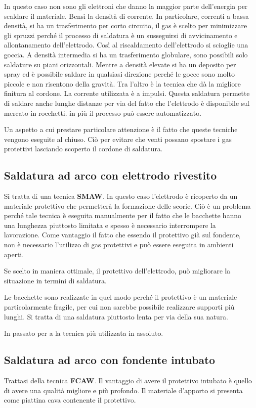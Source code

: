 In questo caso non sono gli elettroni che danno la maggior parte dell'energia per scaldare il materiale. Bensì la densità di corrente.
In particolare, correnti a bassa densità, si ha un trasferimento per corto circuito, il gas è scelto per minimizzare gli spruzzi perché il processo di saldatura è un susseguirsi di avvicinamento e allontanamento dell'elettrodo. Così al riscaldamento dell'elettrodo si scioglie una goccia.
A densità intermedia si ha un trasferimento globulare, sono possibili solo saldature su piani orizzontali.
Mentre a densità elevate si ha un deposito per spray ed è possibile saldare in qualsiasi direzione perché le gocce sono molto piccole e non risentono della gravità. Tra l'altro è la tecnica che dà la migliore finitura al cordone.
La corrente utilizzata è a impulsi.
Questa saldatura permette di saldare anche lunghe distanze per via del fatto che l'elettrodo è disponibile sul mercato in rocchetti.
in più il processo può essere automatizzato.

Un aspetto a cui prestare particolare attenzione è il fatto che queste tecniche vengono eseguite al chiuso. Ciò per evitare che venti possano spostare i gas protettivi lasciando scoperto il cordone di saldatura.

\subsection{Saldatura ad arco con elettrodo rivestito}
Si tratta di una tecnica \textbf{SMAW}. In questo caso l'elettrodo è ricoperto da un materiale protettivo che permetterà la formazione delle scorie.
Ciò è un problema perché tale tecnica è eseguita manualmente per il fatto che le bacchette hanno una lunghezza piuttosto limitata e spesso è necessario interrompere la lavorazione.
Come vantaggio il fatto che essendo il protettivo già sul fondente, non è necessario l'utilizzo di gas protettivi e può essere eseguita in ambienti aperti.

Se scelto in maniera ottimale, il protettivo dell'elettrodo, può migliorare la situazione in termini di saldatura.

Le bacchette sono realizzate in quel modo perché il protettivo è un materiale particolarmente fragile, per cui non sarebbe possibile realizzare supporti più lunghi.
Si tratta di una saldatura piuttosto lenta per via della sua natura.

In passato per a la tecnica più utilizzata in assoluto.

\subsection{Saldatura ad arco con fondente intubato}
Trattasi della tecnica \textbf{FCAW}.
Il vantaggio di avere il protettivo intubato è quello di avere una qualità migliore e più profondo. Il materiale d'apporto si presenta come piattina cava contenente il protettivo.

